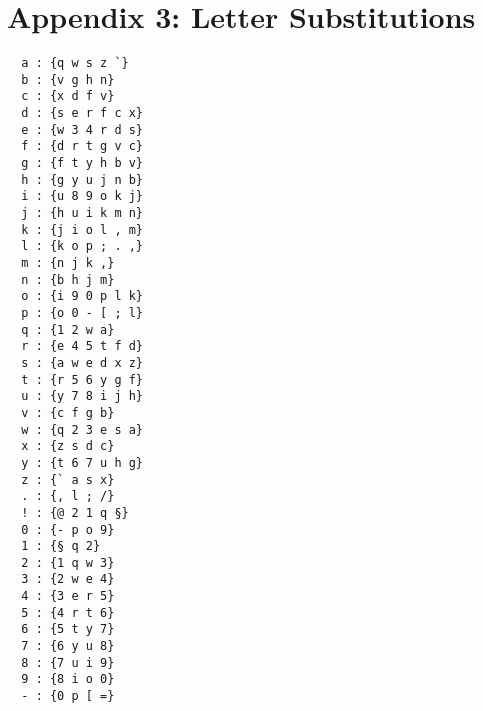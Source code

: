\documentclass{csfourzero}
\begin{document}
\section{Appendix 3: Letter Substitutions}
\begin{multicols}{2}
  \begin{verbatim}
  a : {q w s z `}
  b : {v g h n}
  c : {x d f v}
  d : {s e r f c x}
  e : {w 3 4 r d s}
  f : {d r t g v c}
  g : {f t y h b v}
  h : {g y u j n b}
  i : {u 8 9 o k j}
  j : {h u i k m n}
  k : {j i o l , m}
  l : {k o p ; . ,}
  m : {n j k ,}
  n : {b h j m}
  o : {i 9 0 p l k}
  p : {o 0 - [ ; l}
  q : {1 2 w a}
  r : {e 4 5 t f d}
  s : {a w e d x z}
  t : {r 5 6 y g f}
  u : {y 7 8 i j h}
  v : {c f g b}
  w : {q 2 3 e s a}
  x : {z s d c}
  y : {t 6 7 u h g}
  z : {` a s x}
  . : {, l ; /}
  ! : {@ 2 1 q §}
  0 : {- p o 9}
  1 : {§ q 2}
  2 : {1 q w 3}
  3 : {2 w e 4}
  4 : {3 e r 5}
  5 : {4 r t 6}
  6 : {5 t y 7}
  7 : {6 y u 8}
  8 : {7 u i 9}
  9 : {8 i o 0}
  - : {0 p [ =}
  \end{verbatim}
\end{multicols}
\end{document}
